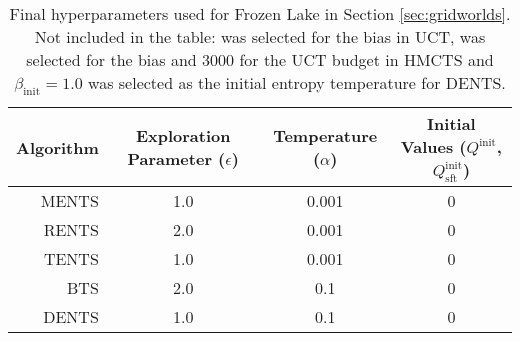 \documentclass{article}
\theoremstyle{plain}
\begin{document}
\begin{appendices}
        \begin{table}[]
            \centering
            \begin{tabular}{r|ccc} 
                Algorithm   & Exploration Parameter ($\epsilon$)    & Temperature ($\alpha$)    & Initial Values ($Q^{\text{init}}$, $Q^{\text{init}}_{\text{sft}}$)    \\
                \hline
                MENTS       & 1.0                                   & 0.001                     & 0                                                                     \\
                RENTS       & 2.0                                   & 0.001                     & 0                                                                     \\
                TENTS       & 1.0                                   & 0.001                     & 0                                                                     \\
                BTS         & 2.0                                   & 0.1                       & 0                                                                     \\
                DENTS       & 1.0                                   & 0.1                       & 0                                                                     \\
            \end{tabular}
            \caption[Final hyperparameters used for Frozen Lake in Section \ref{sec:gridworlds}]{Final hyperparameters used for Frozen Lake in Section \ref{sec:gridworlds}. Not included in the table:  was selected for the bias in UCT,  was selected for the bias and 3000 for the UCT budget in HMCTS and $\beta_{\text{init}}=1.0$ was selected as the initial entropy temperature for DENTS. \label{table:hyper_fl}}
        \end{table}
    

\end{appendices}
\end{document}
